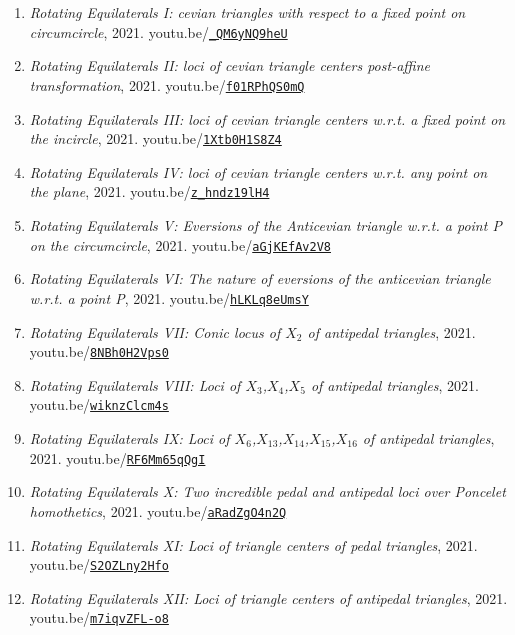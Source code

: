 \documentclass[12pt]{article}
\begin{document}
\begin{enumerate}[resume]
\item \textit{Rotating Equilaterals I: cevian triangles with respect to a fixed point on circumcircle}, 2021. youtu.be/\href{https://youtu.be/_QM6yNQ9heU}{\nolinkurl{\_QM6yNQ9heU}}
\item \textit{Rotating Equilaterals II: loci of cevian triangle centers post-affine transformation}, 2021. youtu.be/\href{https://youtu.be/f01RPhQS0mQ}{\nolinkurl{f01RPhQS0mQ}}
\item \textit{Rotating Equilaterals III: loci of cevian triangle centers w.r.t. a fixed point on the incircle}, 2021. youtu.be/\href{https://youtu.be/1Xtb0H1S8Z4}{\nolinkurl{1Xtb0H1S8Z4}}
\item \textit{Rotating Equilaterals IV: loci of cevian triangle centers w.r.t. any point on the plane}, 2021. youtu.be/\href{https://youtu.be/z_hndz19lH4}{\nolinkurl{z\_hndz19lH4}}
\item \textit{Rotating Equilaterals V: Eversions of the Anticevian triangle w.r.t. a point P on the circumcircle}, 2021. youtu.be/\href{https://youtu.be/aGjKEfAv2V8}{\nolinkurl{aGjKEfAv2V8}}
\item \textit{Rotating Equilaterals VI: The nature of eversions of the anticevian triangle w.r.t. a point P}, 2021. youtu.be/\href{https://youtu.be/hLKLq8eUmsY}{\nolinkurl{hLKLq8eUmsY}}
\item \textit{Rotating Equilaterals VII: Conic locus of $X_{2}$ of antipedal triangles}, 2021. youtu.be/\href{https://youtu.be/8NBh0H2Vps0}{\nolinkurl{8NBh0H2Vps0}}
\item \textit{Rotating Equilaterals VIII: Loci of $X_{3}$,$X_{4}$,$X_{5}$ of antipedal triangles}, 2021. youtu.be/\href{https://youtu.be/wiknzClcm4s}{\nolinkurl{wiknzClcm4s}}
\item \textit{Rotating Equilaterals IX: Loci of $X_{6}$,$X_{13}$,$X_{14}$,$X_{15}$,$X_{16}$ of antipedal triangles}, 2021. youtu.be/\href{https://youtu.be/RF6Mm65qQgI}{\nolinkurl{RF6Mm65qQgI}}
\item \textit{Rotating Equilaterals X: Two incredible pedal and antipedal loci over Poncelet homothetics}, 2021. youtu.be/\href{https://youtu.be/aRadZgO4n2Q}{\nolinkurl{aRadZgO4n2Q}}
\item \textit{Rotating Equilaterals XI: Loci of triangle centers of pedal triangles}, 2021. youtu.be/\href{https://youtu.be/S2OZLny2Hfo}{\nolinkurl{S2OZLny2Hfo}}
\item \textit{Rotating Equilaterals XII: Loci of triangle centers of antipedal triangles}, 2021. youtu.be/\href{https://youtu.be/m7iqvZFL-o8}{\nolinkurl{m7iqvZFL-o8}}
\end{enumerate}
\end{document}
